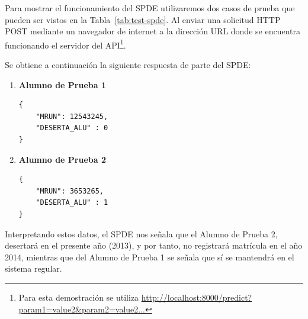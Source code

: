 Para mostrar el funcionamiento del SPDE utilizaremos dos casos de prueba que pueden ser vistos en la Tabla~\ref{tab:test-spde}. Al enviar una solicitud HTTP POST mediante un navegador de internet a la dirección URL donde se encuentra funcionando el servidor del API\footnote{Para esta demostración se utiliza \url{http://localhost:8000/predict?param1=value2&param2=value2...}}.

Se obtiene a continuación la siguiente respuesta de parte del SPDE:
\begin{enumerate}
\item  \textbf{Alumno de Prueba 1} \\ \hfill
\begin{verbatim}
{     
    "MRUN": 12543245,
    "DESERTA_ALU" : 0
}
\end{verbatim}
\item  \textbf{Alumno de Prueba 2} \\ \hfill
\begin{verbatim}
{     
    "MRUN": 3653265,
    "DESERTA_ALU" : 1
}
\end{verbatim}
\end{enumerate}

Interpretando estos datos, el SPDE nos señala que el Alumno de Prueba 2, desertará en el presente año (2013), y por tanto, no registrará matrícula en el año 2014, mientras que del Alumno de Prueba 1 se señala que sí se mantendrá en el sistema regular.

